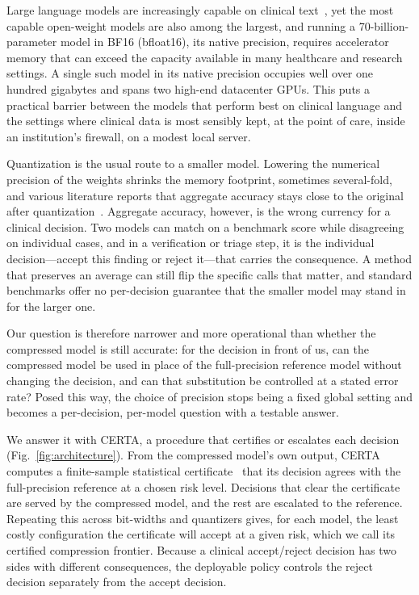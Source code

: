 \documentclass[pdflatex,sn-mathphys-num]{sn-jnl}%
\theoremstyle{thmstyleone}%
\theoremstyle{thmstyletwo}%
\theoremstyle{thmstylethree}%
\begin{document}
Large language models are increasingly capable on clinical text~\cite{singhal2023clinical,thirunavukarasu2023medicine}, yet the most capable open-weight
models are also among the largest, and running a 70-billion-parameter model in BF16 (bfloat16), its native precision,
requires accelerator memory that can exceed the capacity available in many healthcare and research settings. A single such
model in its native precision occupies well over one hundred gigabytes and spans two high-end
datacenter GPUs. This puts a practical barrier between the models that perform best on clinical
language and the settings where clinical data is most sensibly kept, at the point of care, inside an
institution's firewall, on a modest local server.
 
Quantization is the usual route to a smaller model. Lowering the numerical precision of the weights
shrinks the memory footprint, sometimes several-fold, and various literature reports that aggregate
accuracy stays close to the original after quantization~\cite{frantar2023gptq,dettmers2022llmint8,dettmers2023qlora,lin2024awq}. Aggregate accuracy, however, is the wrong
currency for a clinical decision. Two models can match on a benchmark score while disagreeing on
individual cases, and in a verification or triage step, it is the individual decision---accept this
finding or reject it---that carries the consequence. A method that preserves an average can still
flip the specific calls that matter, and standard benchmarks offer no per-decision guarantee that
the smaller model may stand in for the larger one.
 
Our question is therefore narrower and more operational than whether the compressed model is still
accurate: for the decision in front of us, can the compressed model be used in place of the
full-precision reference model without changing the decision, and can that substitution be controlled at a
stated error rate? Posed this way, the choice of precision stops being a fixed global setting and
becomes a per-decision, per-model question with a testable answer.
 
We answer it with CERTA, a procedure that certifies or escalates each decision (Fig.~\ref{fig:architecture}). From the compressed
model's own output, CERTA computes a finite-sample statistical certificate~\cite{angelopoulos2021ltt,angelopoulos2023gentle,angelopoulos2024crc} that its decision agrees
with the full-precision reference at a chosen risk level. Decisions that clear the certificate are
served by the compressed model, and the rest are escalated to the reference. Repeating this across
bit-widths and quantizers gives, for each model, the least costly configuration the certificate will
accept at a given risk, which we call its certified compression frontier. Because a clinical
accept/reject decision has two sides with different consequences, the deployable policy controls the
reject decision separately from the accept decision.
 
\end{document}

